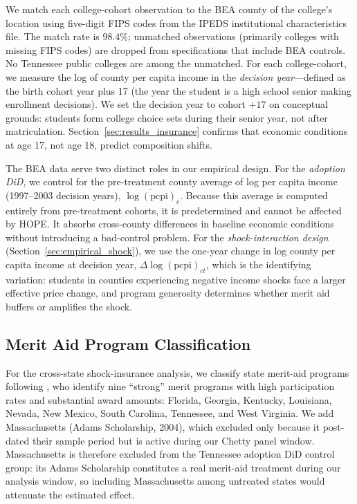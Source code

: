 We match each college-cohort observation to the BEA county of the
college's location using five-digit FIPS codes from the IPEDS
institutional characteristics file. The match rate is 98.4\%; unmatched observations (primarily colleges
with missing FIPS codes) are dropped from specifications that include
BEA controls. No Tennessee public colleges are among the unmatched.
For each college-cohort, we measure the log of county per capita
income in the
\emph{decision year}---defined as the birth cohort year plus 17 (the
year the student is a high school senior making enrollment decisions).
We set the decision year to cohort $+ 17$ on conceptual grounds:
students form college choice sets during their senior year, not after
matriculation. Section~\ref{sec:results_insurance} confirms that
economic conditions at age 17, not age 18, predict composition shifts.

The BEA data serve two distinct roles in our empirical design.
For the \emph{adoption DiD}, we control for the pre-treatment county
average of log per capita income (1997--2003 decision years),
$\overline{\log(\text{pcpi})}_{c}$. Because this average is computed
entirely from pre-treatment cohorts, it is predetermined and cannot
be affected by HOPE. It absorbs cross-county differences in baseline
economic conditions without introducing a bad-control problem.
For the \emph{shock-interaction design}
(Section~\ref{sec:empirical_shock}), we use the one-year change in
log county per capita income at decision year,
$\Delta \log(\text{pcpi})_{ct}$, which is the identifying variation:
students in counties experiencing negative income shocks face a larger
effective price change, and program generosity determines whether
merit aid buffers or amplifies the shock.

\subsection{Merit Aid Program Classification}
\label{sec:data_programs}

For the cross-state shock-insurance analysis, we classify state
merit-aid programs following \textcite{sjoquist2015state}, who identify
nine ``strong'' merit programs with high participation rates and
substantial award amounts: Florida, Georgia, Kentucky, Louisiana,
Nevada, New Mexico, South Carolina, Tennessee, and West Virginia. We
add Massachusetts (Adams Scholarship, 2004), which
\textcite{sjoquist2015state} excluded only because it post-dated their
sample period but is active during our Chetty panel window.
Massachusetts is therefore excluded from the Tennessee adoption DiD
control group: its Adams Scholarship constitutes a real merit-aid
treatment during our analysis window, so including Massachusetts among
untreated states would attenuate the estimated effect.

